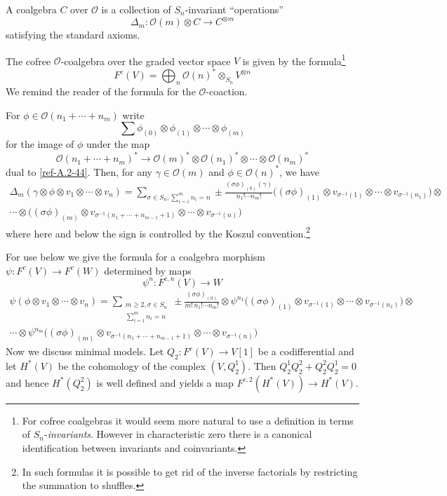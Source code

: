 \documentclass{amsart}
\numberwithin{equation}{section}
\let\cal\mathcal
\theoremstyle{definition}
\theoremstyle{remark}
\begin{document}
A  coalgebra $C$ over ${{\cal O}}$ is a collection of 
$S_n$-invariant ``operations''
\[
\Delta_m:{{\cal O}}(m)\otimes C\rightarrow C^{\otimes m}
\]
satisfying the standard axioms.

The cofree ${{\cal O}}$-coalgebra over the graded vector space $V$ is given
by the formula\footnote{For cofree coalgebras it would seem more natural to use a definition in terms of $S_n$-\emph{invariants}. However in characteristic zero
there is a canonical identification between invariants and coinvariants.}
\begin{equation}
\label{ref-A.3-45}
F^c(V)=\bigoplus_n{{\cal O}}(n)^\ast \otimes_{S_n} V^{\otimes n}
\end{equation}
We remind the reader of the formula for the ${{\cal O}}$-coaction. 

For $\phi\in {{\cal O}}(n_1+\cdots+n_m)$ write
\[
\sum\phi_{(0)}\otimes\phi_{(1)}\otimes\cdots\otimes \phi_{(m)}
\]
for the image of $\phi$ under the map
\[
{{\cal O}}(n_1+\cdots+n_m)^\ast\rightarrow {{\cal O}}(m)^\ast\otimes {{\cal O}}(n_1)^\ast
\otimes \cdots\otimes  {{\cal O}}(n_m)^\ast
\]
dual to \eqref{ref-A.2-44}.
Then, for any $\gamma\in\mathcal O(m)$ and $\phi\in\mathcal O(n)^*$, we have 
\begin{multline*}
\Delta_m(\gamma\otimes \phi\otimes v_1\otimes\cdots \otimes v_{n})=
\sum_{\sigma\in S_n, \sum_{i=1}^m\!n_i=n}\pm
\frac{(\sigma\phi)_{(0)}(
\gamma)}
{n_1!\cdots n_m!} \bigl((\sigma\phi)_{(1)}\otimes v_{\sigma^{-1}(1)}
\otimes\cdots \otimes v_{\sigma^{-1}(n_1)}\bigr)
\otimes\\
\cdots
\otimes 
\bigl ((\sigma\phi)_{(m)}\otimes v_{\sigma^{-1}(n_1+\cdots+n_{m-1}+1)}
\otimes\cdots \otimes v_{\sigma^{-1}(n)}\bigr)
\end{multline*}
where here and below the sign is controlled by the Koszul
convention.\footnote{In such formulas it is possible to get rid of the inverse 
factorials by restricting the summation to shuffles.}

For use below we give the
formula for a coalgebra morphism $\psi:F^{c}(V)\rightarrow F^c(W)$ determined by
maps
\[
\psi^n:F^{c,n}(V)\rightarrow W
\]
\begin{multline}
\label{ref-A.4-46}
  \psi(\phi\otimes v_1\otimes\cdots\otimes v_n)
  =
  \sum_{\begin{smallmatrix}m\geq2,\sigma\in S_n\\ \sum_{i=1}^m n_i=n\end{smallmatrix}}\pm
  \frac{(\sigma\phi)_{(0)}}{m!\,n_1!\cdots n_m!}\otimes \psi^{n_1}\bigl((\sigma\phi)_{(1)}\otimes
  v_{\sigma^{-1}(1)}\otimes\cdots \otimes
  v_{\sigma^{-1}(n_1)}\bigr)\otimes\\\cdots \otimes
  \psi^{n_m}\bigl((\sigma\phi)_{(m)}\otimes
  v_{\sigma^{-1}(n_1+\cdots+n_{m-1}+1)}\otimes\cdots \otimes
  v_{\sigma^{-1}(n)}\bigr)
\end{multline}
Now we discuss minimal models.  Let $Q_2:F^c(V)\rightarrow V[1]$ be a
codifferential and let $H^\ast(V)$ be the cohomology of the complex
$(V,Q^1_2)$. Then $Q_2^1Q_2^2+Q_2^2Q_2^1=0$ and hence $H^\ast(Q_2^2)$
is well defined and yields a map $F^{c,2}(H^\ast(V))\rightarrow H^\ast(V)$.
\end{document}
